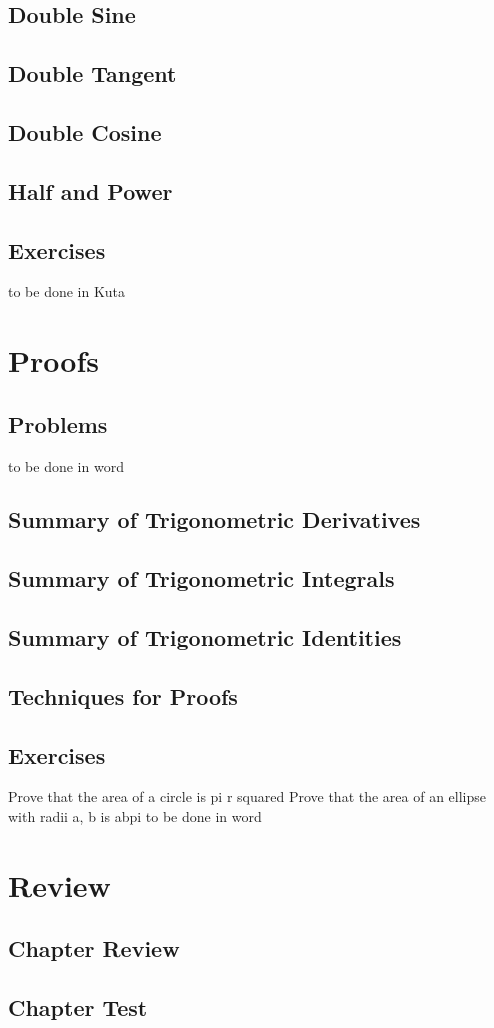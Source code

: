 \subsection{Double Sine}
\subsection{Double Tangent}
\subsection{Double Cosine}
\subsection{Half and Power}
\newpage
\subsection{Exercises}
to be done in Kuta


\newpage
\section{Proofs}
\subsection{Problems}
to be done in word
\newpage
\subsection{Summary of Trigonometric Derivatives}
\subsection{Summary of Trigonometric Integrals}
\subsection{Summary of Trigonometric Identities}
\subsection{Techniques for Proofs}
\newpage
\subsection{Exercises}
Prove that the area of a circle is pi r squared
Prove that the area of an ellipse with radii a, b is abpi
to be done in word


\newpage
\section{Review}
\subsection{Chapter Review}
\subsection{Chapter Test}